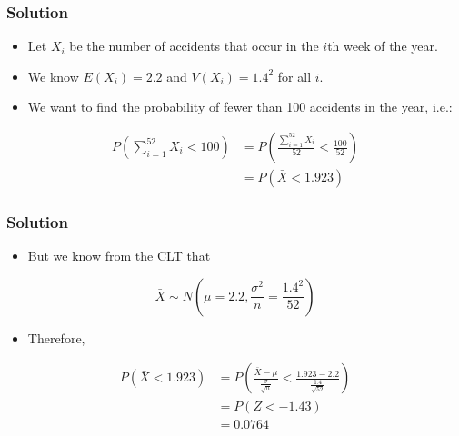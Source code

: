 \documentclass[14pt]{beamer}
\begin{document}
\begin{frame}
	\frametitle{Solution}
	
	\begin{itemize}[label={\color{blue}$\blacktriangleright$}]
		\item Let $X_i$ be the number of accidents that occur in the $i$th week of the year.
		\item We know $E(X_i) = 2.2$ and $V(X_i) = 1.4^2$ for all $i$.
		\item We want to find the probability of fewer than 100 accidents in the year, i.e.:
	\end{itemize}
	
	\vspace{0.5em}
	
	\begin{align*}
		P\left(\sum_{i=1}^{52} X_i < 100\right) &= P\left(\frac{\sum_{i=1}^{52} X_i}{52} < \frac{100}{52}\right) \\[1ex]
		&= P(\bar{X} < 1.923)
	\end{align*}
	
\end{frame}

\begin{frame}
	\frametitle{Solution}
	
	\begin{itemize}[label={\color{blue}$\blacktriangleright$}]
		\item But we know from the CLT that
	\end{itemize}
	
	\[
	\bar{X} \sim N \left(\mu = 2.2, \frac{\sigma^2}{n} = \frac{1.4^2}{52}\right)
	\]
	
	\begin{itemize}[label={\color{blue}$\blacktriangleright$}]
		\item Therefore,
	\end{itemize}
	
	\begin{align*}
		P(\bar{X} < 1.923) &= P\left(\frac{\bar{X} - \mu}{\frac{\sigma}{\sqrt{n}}} < \frac{1.923 - 2.2}{\frac{1.4}{\sqrt{52}}}\right) \\[1ex]
		&= P(Z < -1.43) \\[1ex]
		&= 0.0764
	\end{align*}
	
\end{frame}
\end{document}
